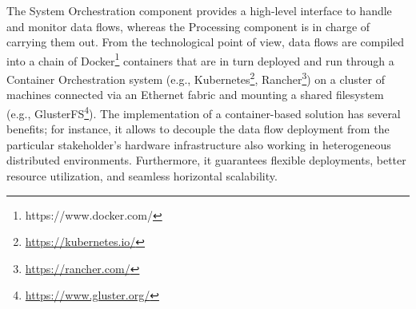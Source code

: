 The System Orchestration component provides a high-level interface to handle and monitor data flows, whereas the Processing component is in charge of carrying them out. From the technological point of view, data flows are compiled into a chain of Docker\footnote{https://www.docker.com/} containers that are in turn deployed and run through a Container Orchestration system (e.g., Kubernetes\footnote{\url{https://kubernetes.io/}}, Rancher\footnote{\url{https://rancher.com/}}) on a cluster of machines connected via an Ethernet fabric and mounting a shared filesystem (e.g., GlusterFS\footnote{\url{https://www.gluster.org/}}).
The implementation of a container-based solution has several benefits; for instance, it allows to decouple the data flow deployment from the particular stakeholder's hardware infrastructure also working in heterogeneous distributed environments. Furthermore, it guarantees flexible deployments, better resource utilization, and seamless horizontal scalability.  

